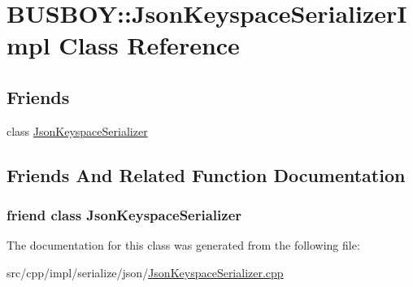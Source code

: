 \hypertarget{classBUSBOY_1_1JsonKeyspaceSerializerImpl}{
\section{BUSBOY::JsonKeyspaceSerializerImpl Class Reference}
\label{classBUSBOY_1_1JsonKeyspaceSerializerImpl}
}
\subsection*{Friends}
\begin{DoxyCompactItemize}
\item 
class \hyperlink{classBUSBOY_1_1JsonKeyspaceSerializerImpl_a14048157fa8e0f9d1481660242626360}{JsonKeyspaceSerializer}
\end{DoxyCompactItemize}


\subsection{Friends And Related Function Documentation}
\hypertarget{classBUSBOY_1_1JsonKeyspaceSerializerImpl_a14048157fa8e0f9d1481660242626360}{
\subsubsection[{JsonKeyspaceSerializer}]{\setlength{\rightskip}{0pt plus 5cm}friend class {\bf JsonKeyspaceSerializer}}}
\label{classBUSBOY_1_1JsonKeyspaceSerializerImpl_a14048157fa8e0f9d1481660242626360}


The documentation for this class was generated from the following file:\begin{DoxyCompactItemize}
\item 
src/cpp/impl/serialize/json/\hyperlink{JsonKeyspaceSerializer_8cpp}{JsonKeyspaceSerializer.cpp}\end{DoxyCompactItemize}

